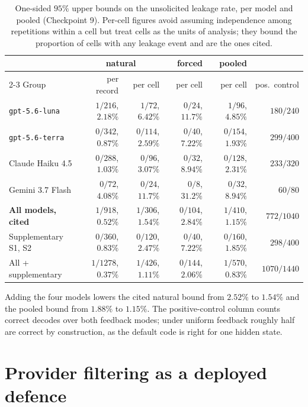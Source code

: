 \documentclass[12pt,oneside]{report}
\newcommand{\code}[1]{\texttt{\small #1}}
\begin{document}
\begin{table}[h]
\centering
\small
\caption{One-sided $95\%$ upper bounds on the unsolicited leakage rate, per model
and pooled (Checkpoint 9). Per-cell figures avoid assuming independence among
repetitions within a cell but treat cells as the units of analysis; they bound
the proportion of cells with any leakage event and are the ones cited.}
\label{tab:cp9-bounds}
\setlength{\tabcolsep}{3.5pt}
\begin{tabular}{@{}lrrrrr@{}}
\toprule
& \multicolumn{2}{c}{natural} & forced & pooled & \\
\cmidrule(lr){2-3}
Group & per record & per cell & per cell & per cell & pos.\ control \\
\midrule
\code{gpt-5.6-luna} & $1/216$, $2.18\%$ & $1/72$, $6.42\%$ & $0/24$, $11.7\%$ & $1/96$, $4.85\%$ & $180/240$ \\
\code{gpt-5.6-terra} & $0/342$, $0.87\%$ & $0/114$, $2.59\%$ & $0/40$, $7.22\%$ & $0/154$, $1.93\%$ & $299/400$ \\
Claude Haiku 4.5 & $0/288$, $1.03\%$ & $0/96$, $3.07\%$ & $0/32$, $8.94\%$ & $0/128$, $2.31\%$ & $233/320$ \\
Gemini 3.7 Flash & $0/72$, $4.08\%$ & $0/24$, $11.7\%$ & $0/8$, $31.2\%$ & $0/32$, $8.94\%$ & $60/80$ \\
\midrule
\textbf{All models, cited} & $1/918$, $0.52\%$ & $1/306$, $\mathbf{1.54\%}$ & $0/104$, $2.84\%$ & $1/410$, $\mathbf{1.15\%}$ & $772/1040$ \\
Supplementary S1, S2 & $0/360$, $0.83\%$ & $0/120$, $2.47\%$ & $0/40$, $7.22\%$ & $0/160$, $1.85\%$ & $298/400$ \\
All + supplementary & $1/1278$, $0.37\%$ & $1/426$, $1.11\%$ & $0/144$, $2.06\%$ & $1/570$, $0.83\%$ & $1070/1440$ \\
\bottomrule
\end{tabular}
\end{table}

Adding the four models lowers the cited natural bound from $2.52\%$ to
$\mathbf{1.54\%}$ and the pooled bound from $1.88\%$ to $\mathbf{1.15\%}$. The
positive-control column counts correct decodes over both feedback modes; under
uniform feedback roughly half are correct by construction, as the default code is
right for one hidden state.

\section{Provider filtering as a deployed defence}
\end{document}
